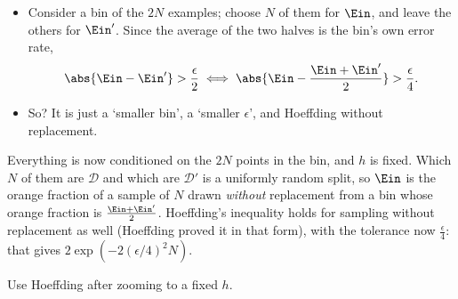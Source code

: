 \begin{itemize}
    \item Consider a bin of the \(2N\) examples; choose \(N\) of them for
        \(\Ein\), and leave the others for \(\Ein'\). Since the average of the
        two halves is the bin's own error rate,
        \[
            \abs{\Ein - \Ein'} > \frac{\epsilon}{2}
            \iff
            \abs{\Ein - \frac{\Ein + \Ein'}{2}} > \frac{\epsilon}{4} .
        \]
    \item So? It is just a `smaller bin', a `smaller \(\epsilon\)', and
        Hoeffding without replacement.
\end{itemize}

\begin{center}
\end{center}

Everything is now conditioned on the \(2N\) points in the bin, and \(h\) is
fixed. Which \(N\) of them are \(\mathcal{D}\) and which are \(\mathcal{D}'\)
is a uniformly random split, so \(\Ein\) is the orange fraction of a sample of
\(N\) drawn \emph{without} replacement from a bin whose orange fraction is
\(\frac{\Ein + \Ein'}{2}\). Hoeffding's inequality holds for sampling without
replacement as well (Hoeffding proved it in that form), with the tolerance now
\(\frac{\epsilon}{4}\): that gives \(2\exp(-2(\epsilon/4)^2 N)\).

\begin{moral}
    Use Hoeffding after zooming to a fixed \(h\).
\end{moral}

